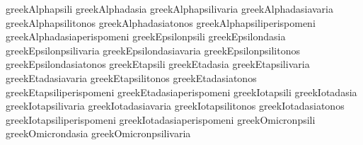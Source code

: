  greekAlphapsili                   {\psili \greekAlpha}
 greekAlphadasia                   {\dasia \greekAlpha}
 greekAlphapsilivaria              {\greekpsilivaria \greekAlpha}
 greekAlphadasiavaria              {\greekdasiavaria \greekAlpha}
 greekAlphapsilitonos              {\greekpsilitonos \greekAlpha}
 greekAlphadasiatonos              {\greekdasiatonos \greekAlpha}
 greekAlphapsiliperispomeni        {\greekpsiliperispomeni \greekAlpha}
 greekAlphadasiaperispomeni        {\greekdasiaperispomeni \greekAlpha}
 greekEpsilonpsili                 {\psili \greekEpsilon}
 greekEpsilondasia                 {\dasia \greekEpsilon}
 greekEpsilonpsilivaria            {\greekpsilivaria \greekEpsilon}
 greekEpsilondasiavaria            {\greekdasiavaria \greekEpsilon}
 greekEpsilonpsilitonos            {\greekpsilitonos \greekEpsilon}
 greekEpsilondasiatonos            {\greekdasiatonos \greekEpsilon}
 greekEtapsili                     {\psili \greekEta}
 greekEtadasia                     {\dasia \greekEta}
 greekEtapsilivaria                {\greekpsilivaria \greekEta}
 greekEtadasiavaria                {\greekdasiavaria \greekEta}
 greekEtapsilitonos                {\greekpsilitonos \greekEta}
 greekEtadasiatonos                {\greekdasiatonos \greekEta}
 greekEtapsiliperispomeni          {\greekpsiliperispomeni \greekEta}
 greekEtadasiaperispomeni          {\greekdasiaperispomeni \greekEta}
 greekIotapsili                    {\psili \greekIota}
 greekIotadasia                    {\dasia \greekIota}
 greekIotapsilivaria               {\greekpsilivaria \greekIota}
 greekIotadasiavaria               {\greekdasiavaria \greekIota}
 greekIotapsilitonos               {\greekpsilitonos \greekIota}
 greekIotadasiatonos               {\greekdasiatonos \greekIota}
 greekIotapsiliperispomeni         {\greekpsiliperispomeni \greekIota}
 greekIotadasiaperispomeni         {\greekdasiaperispomeni \greekIota}
 greekOmicronpsili                 {\psili \greekOmicron}
 greekOmicrondasia                 {\dasia \greekOmicron}
 greekOmicronpsilivaria            {\greekpsilivaria \greekOmicron}
